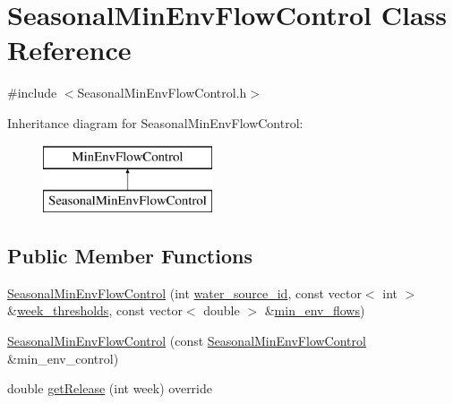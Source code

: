 \hypertarget{classSeasonalMinEnvFlowControl}{}\section{Seasonal\+Min\+Env\+Flow\+Control Class Reference}
\label{classSeasonalMinEnvFlowControl}


{\ttfamily \#include $<$Seasonal\+Min\+Env\+Flow\+Control.\+h$>$}

Inheritance diagram for Seasonal\+Min\+Env\+Flow\+Control\+:\begin{figure}[H]
\begin{center}
\leavevmode
\includegraphics[height=2.000000cm]{classSeasonalMinEnvFlowControl}
\end{center}
\end{figure}
\subsection*{Public Member Functions}
\begin{DoxyCompactItemize}
\item 
\mbox{\hyperlink{classSeasonalMinEnvFlowControl_a02ea55181dd200190a6b792e57f30193_a02ea55181dd200190a6b792e57f30193}{Seasonal\+Min\+Env\+Flow\+Control}} (int \mbox{\hyperlink{classMinEnvFlowControl_aada518a047598f386daec1d0358023aa_aada518a047598f386daec1d0358023aa}{water\+\_\+source\+\_\+id}}, const vector$<$ int $>$ \&\mbox{\hyperlink{classSeasonalMinEnvFlowControl_adea056def640b4e799b8549383838317_adea056def640b4e799b8549383838317}{week\+\_\+thresholds}}, const vector$<$ double $>$ \&\mbox{\hyperlink{classSeasonalMinEnvFlowControl_aa9225667157707da3230276d0de890ba_aa9225667157707da3230276d0de890ba}{min\+\_\+env\+\_\+flows}})
\item 
\mbox{\hyperlink{classSeasonalMinEnvFlowControl_ad0eeb570fc096a92b788b5c4a48bcec4_ad0eeb570fc096a92b788b5c4a48bcec4}{Seasonal\+Min\+Env\+Flow\+Control}} (const \mbox{\hyperlink{classSeasonalMinEnvFlowControl}{Seasonal\+Min\+Env\+Flow\+Control}} \&min\+\_\+env\+\_\+control)
\item 
double \mbox{\hyperlink{classSeasonalMinEnvFlowControl_a5c5ddcab367812bdd2e23b383449d202_a5c5ddcab367812bdd2e23b383449d202}{get\+Release}} (int week) override
\end{DoxyCompactItemize}
